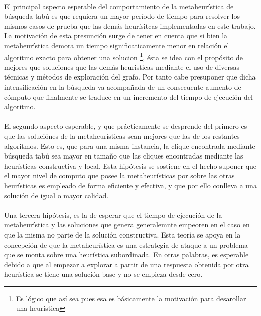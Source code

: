 \paragraph{}
El principal aspecto esperable del comportamiento de la metaheurística de búsqueda tabú es que requiera un mayor período de tiempo para resolver los mismos casos de prueba que las demás heurísitcas implementadas en este trabajo. La motivación de esta presunción surge de tener en cuenta que si bien la metaheurística demora un tiempo significaticamente menor en relación el algoritmo exacto para obtener una solucion \footnote{Es lógico que así sea pues esa es básicamente la motivación para desarollar una heurística}, ésta se idea con el propósito de mejores que soluciones que las demás heuristicas mediante el uso de diversas técnicas y métodos de exploración del grafo. Por tanto cabe presuponer que dicha intensificación en la búsqueda va acompañada de un consecuente aumento de cómputo que finalmente se traduce en un incremento del tiempo de ejecución del algoritmo.

\paragraph{}
El segundo aspecto esperable, y que prácticamente se desprende del primero es que las soluciónes de la metaheurísticas sean mejores que las de los restantes algoritmos. Esto es, que para una misma instancia, la clique encontrada mediante búsqueda tabú sea mayor en tamaño que las cliques encontradas mediante las heurísticas constructiva y local. Esta hipótesis se sostiene en el hecho suponer que el mayor nivel de computo que posee la metaheurísticas por sobre las otras heurísticas es empleado de forma eficiente y efectiva, y que por ello conlleva a una solución de igual o mayor calidad.

\paragraph{}
Una tercera hipótesis, es la de esperar que el tiempo de ejecución de la metaheurística y las soluciones que genera generalemnte empeoren en el caso en que la misma no parte de la solución constructiva. Esta teoría se apoya en la concepción de que la metaheurística es una estrategia de ataque a un problema que se monta sobre una heurística subordinada. En otras palabras, es esperable debido a que al empezar a explorar a partir de una respuesta obtenida por otra heurística se tiene una solución base y no se empieza desde cero.

